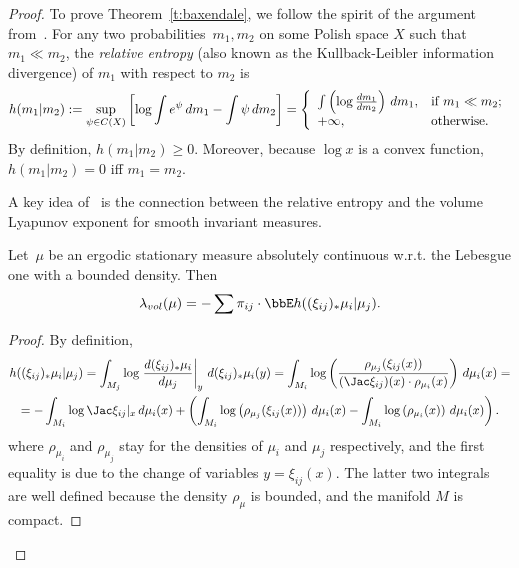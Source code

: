 \documentclass[a4paper,12pt]{amsart}
\begin{document}
\begin{proof}

To prove Theorem~\ref{t:baxendale}, we follow the spirit of the argument
from~\cite[Theorem 4.2]{Baxendale1989}. For any two probabilities~$m_1, m_2$ on some Polish space $X$ such that $m_1 \ll m_2$, the \emph{relative entropy} (also known as the Kullback-Leibler information divergence) of $m_1$ with respect to $m_2$ is
\begin{equation}\label{e:rel-entropy}
h(m_1|m_2) := \sup_{\psi \in C(X)} \left[ \log \int e^\psi \,dm_1 - \int \psi \,dm_2 \right] =
\left\{
  \begin{array}{ll}
    \int \left( \log \frac{dm_1}{dm_2} \right) \,dm_1, & \hbox{if $m_1 \ll m_2$;}   \\
    +\infty, & \hbox{otherwise.}
  \end{array}
\right.
\end{equation}
By definition, $h(m_1|m_2) \ge 0$. Moreover, because $\log x$ is a convex function, $h(m_1|m_2) = 0$ iff $m_1 = m_2$.

A key idea of~\cite{Baxendale1989} is the connection between the relative entropy and the volume Lyapunov exponent for smooth invariant measures.
\begin{Prop}
Let~$\mu$ be an ergodic stationary measure absolutely continuous w.r.t. the Lebesgue one with a bounded density. Then
\begin{equation}\label{e:lyap-vol-entropy}
    \lambda_{vol}(\mu) = -\sum \pi_{ij} \cdot \bbE h ((\xi_{ij})_* \mu_i | \mu_j).
\end{equation}
\end{Prop}

\begin{proof}
By definition,
\begin{multline}\label{e:lyap-rel}
h ((\xi_{ij})_* \mu_i | \mu_j) = \int_{M_j} \log \left. \frac{d (\xi_{ij})_* \mu_i}{d\mu_j}\right|_{y}  \, d (\xi_{ij})_* \mu_i(y)= \int_{M_i} \log \left(\frac {\rho_{\mu_j}(\xi_{ij}(x))}{(\Jac \xi_{ij})(x) \cdot \rho_{\mu_i}(x)}\right) \, d \mu_i(x)=
\\
= -  \int_{M_i} \log \Jac \xi_{ij}|_{x}  \, d \mu_i(x) + \left(
\int_{M_i} \log \left({\rho_{\mu_j}(\xi_{ij}(x))}\right) \, d \mu_i(x) -
\int_{M_i} \log \left({\rho_{\mu_i}(x)}\right) \, d \mu_i(x)\right).
\end{multline}
where $\rho_{\mu_i}$ and $\rho_{\mu_j}$ stay for the densities of $\mu_i$ and $\mu_j$ respectively, and the first equality is due to the change of variables $y=\xi_{ij}(x)$. The latter two integrals are well defined because the density $\rho_{\mu}$ is bounded, and the manifold $M$ is compact.


\end{proof}
\end{proof}
\end{document}
